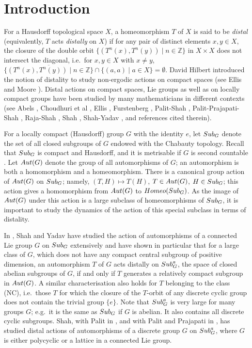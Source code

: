\documentclass{amsart}
\numberwithin{equation}{section}
\newcommand{\Aut}{{\rm Aut}}
\newcommand{\Homeo}{{\rm Homeo}}
\newcommand{\Sub}{{\rm Sub}}
\newcommand{\Z}{{\mathbb Z}}
\let\ol=\overline
\theoremstyle{remark}
\begin{document}
\tableofcontents

\section{Introduction}

For a Hausdorff topological space $X$, a homeomorphism $T$ of $X$  
is said to be {\it distal} (equivalently, $T$ acts {\it distally} on $X$) if for any pair of distinct 
elements $x,y \in X$, the closure of the double orbit 
$\{(T^n(x), T^n(y)) \mid n\in \Z\}$ in $X \times X$ does not intersect 
the diagonal, i.e.\ for $x,y \in X$ with $x \neq y $, 
$\ol{\{(T^n(x), T^n(y))\mid n \in \Z\}} \cap \{(a,a)\mid a \in X\}=\emptyset$. 
David Hilbert introduced the notion of distality to study non-ergodic actions on compact spaces 
(see Ellis \cite{E} and Moore \cite{M9}). Distal actions on compact spaces, Lie groups as well as 
on locally compact groups have been studied by many mathematicians in different contexts 
(see Abels \cite{Ab1, Ab2}, Choudhuri et al \cite{CFY}, Ellis \cite{E}, 
Furstenberg \cite{Fu}, Palit-Shah \cite{PaS}, Palit-Prajapati-Shah \cite{PaPrS}, Raja-Shah 
\cite{RS1, RS2}, Shah \cite{Sh1}, Shah-Yadav \cite{SY1, SY2, SY3}, and references cited therein).

For a locally compact (Hausdorff) group  $G$ with the identity $e$, let $\Sub_G$ 
denote the set of all closed subgroups of $G$  endowed with the Chabauty topology. 
Recall that $\Sub_G$ is compact and Hausdorff, and it is metrisable if $G$ is 
second countable \cite{BP}. Let $\Aut(G)$ denote the group of all automorphisms of $G$; 
an automorphism is both a homomorphism and a homeomorphism. 
There is a canonical group action of $\Aut(G)$ on $\Sub_G$; namely, $(T,H)\mapsto T(H)$, $T \in \Aut(G)$, 
$H\in \Sub_G$; this action gives a homomorphism from $\Aut(G)$ to $\Homeo(\Sub_G)$. As the image
of $\Aut(G)$ under this action is a large subclass of homeomorphisms of $\Sub_G$, it is  
important to study the dynamics of the action of this special subclass in terms of distality. 

In \cite{SY3}, Shah and Yadav have studied the action of automorphisms of a connected Lie group $G$ 
on $\Sub_G$ extensively and have shown in particular that for a large class of $G$, which does not have 
any compact central subgroup of positive dimension, an automorphism $T$ of $G$ acts distally on 
$\Sub^a_G$, the space of closed abelian subgroups of $G$, if and only if $T$ generates 
a relatively compact subgroup in $\Aut(G)$. A similar characterisation also holds for $T$ 
belonging to the class (NC), i.e.\ those 
$T$ for which the closure of the $T$-orbit of any discrete cyclic group does not contain 
the trivial group $\{e\}$. Note that $\Sub^a_G$ is very large for many groups $G$; e.g.\ it is the 
same as $\Sub_G$ if $G$ is abelian. It also contains all discrete cyclic subgroups. 
Shah, with Palit in \cite{PaS}, and with Palit and Prajapati in \cite{PaPrS}, has 
studied distal actions of automorphisms of a discrete group $G$ on $\Sub^a_G$, where $G$ is  
either polycyclic or a lattice in a connected Lie group. 
\end{document}
